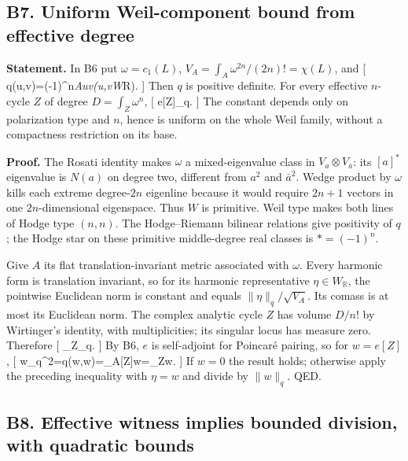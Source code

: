 \documentclass[11pt,a4paper]{article}
\theoremstyle{definition}
\begin{document}
\subsection{B7. Uniform Weil-component bound from effective
degree}\label{b7.-uniform-weil-component-bound-from-effective-degree}

\textbf{Statement.} In B6 put \(\omega=c_1(L)\),
\(V_A=\int_A\omega^{2n}/(2n)!=\chi(L)\), and {[}
q(u,v)=(-1)\^{}n\int\emph{Au\wedge v\quad(u,v\in W}\mathbb R). {]} Then
\(q\) is positive definite. For every effective \(n\)-cycle \(Z\) of
degree \(D=\int_Z\omega^n\), {[}
\textbar e{[}Z{]}\textbar\_q\leq{}. {]} The constant
depends only on polarization type and \(n\), hence is uniform on the
whole Weil family, without a compactness restriction on its base.

\textbf{Proof.} The Rosati identity makes \(\omega\) a mixed-eigenvalue
class in \(V_a\otimes V_{\bar a}\): its \([a]^*\) eigenvalue is \(N(a)\)
on degree two, different from \(a^2\) and \(\bar a^2\). Wedge product by
\(\omega\) kills each extreme degree-\(2n\) eigenline because it would
require \(2n+1\) vectors in one \(2n\)-dimensional eigenspace. Thus
\(W\) is primitive. Weil type makes both lines of Hodge type \((n,n)\).
The Hodge--Riemann bilinear relations give positivity of \(q\); the
Hodge star on these primitive middle-degree real classes is
\(*=(-1)^n\).

Give \(A\) its flat translation-invariant metric associated with
\(\omega\). Every harmonic form is translation invariant, so for its
harmonic representative \(\eta\in W_\mathbb R\), the pointwise Euclidean
norm is constant and equals \(\|\eta\|_q/\sqrt{V_A}\). Its comass is at
most its Euclidean norm. The complex analytic cycle \(Z\) has volume
\(D/n!\) by Wirtinger's identity, with multiplicities; its singular
locus has measure zero. Therefore {[}
\left\textbar{}\int\_Z\eta\right\textbar{}\leq{}\textbar{}\eta\textbar\_q.
{]} By B6, \(e\) is self-adjoint for Poincaré pairing, so for
\(w=e[Z]\), {[}
\textbar w\textbar\_q\^{}2=\textbar q(w,w)\textbar=\left\textbar{}\int\_A{[}Z{]}\wedge w\right\textbar=\left\textbar{}\int\_Zw\right\textbar.
{]} If \(w=0\) the result holds; otherwise apply the preceding
inequality with \(\eta=w\) and divide by \(\|w\|_q\). QED.

\subsection{B8. Effective witness implies bounded division, with
quadratic
bounds}\label{b8.-effective-witness-implies-bounded-division-with-quadratic-bounds}
\end{document}
